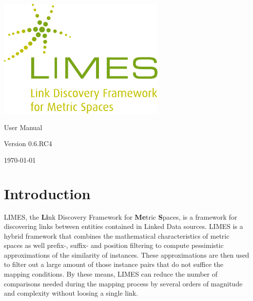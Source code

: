 \documentclass[a4paper, 11pt]{article}
\begin{document}
\thispagestyle{empty}
\begin{titlepage}
\begin{center}
\includegraphics[width=\textwidth]{images/limes_logo.pdf}

\centering
\Huge User Manual

\huge Version 0.6.RC4

\vfill
{\large \today}
\end{center}
\end{titlepage}
\tableofcontents

\newpage
\section{Introduction}
LIMES, the \textbf{Li}nk Discovery Framework for \textbf{Me}tric \textbf{S}paces, is a framework for discovering links between entities contained in Linked Data sources. LIMES is a hybrid framework that combines the mathematical characteristics of metric spaces as well prefix-, suffix- and position filtering to compute pessimistic approximations of the similarity of instances. These approximations are then used to filter out a large amount of those instance pairs that do not suffice the mapping conditions. By these means, LIMES can reduce the number of comparisons needed during the mapping process by several orders of magnitude and complexity without loosing a single link.
\end{document}
